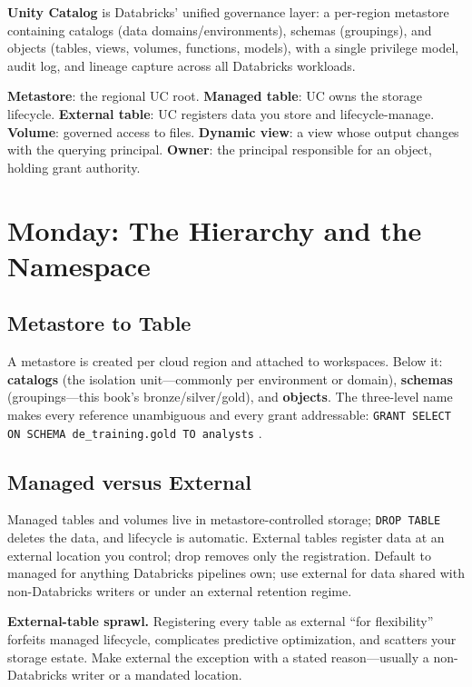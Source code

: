 \begin{definitionbox}
\textbf{Unity Catalog} is Databricks' unified governance layer: a per-region metastore containing catalogs (data domains/environments), schemas (groupings), and objects (tables, views, volumes, functions, models), with a single privilege model, audit log, and lineage capture across all Databricks workloads.
\end{definitionbox}

\begin{keyterms}
\textbf{Metastore}: the regional UC root. \textbf{Managed table}: UC owns the storage lifecycle. \textbf{External table}: UC registers data you store and lifecycle-manage. \textbf{Volume}: governed access to files. \textbf{Dynamic view}: a view whose output changes with the querying principal. \textbf{Owner}: the principal responsible for an object, holding grant authority.
\end{keyterms}

\section{Monday: The Hierarchy and the Namespace}
\subsection{Metastore to Table}
A metastore is created per cloud region and attached to workspaces. Below it: \textbf{catalogs} (the isolation unit---commonly per environment or domain), \textbf{schemas} (groupings---this book's bronze/silver/gold), and \textbf{objects}. The three-level name makes every reference unambiguous and every grant addressable: \texttt{GRANT SELECT ON SCHEMA de\_training.gold TO analysts} \cite{databricksUnityCatalog}.

\subsection{Managed versus External}
Managed tables and volumes live in metastore-controlled storage; \texttt{DROP TABLE} deletes the data, and lifecycle is automatic. External tables register data at an external location you control; drop removes only the registration. Default to managed for anything Databricks pipelines own; use external for data shared with non-Databricks writers or under an external retention regime.

\begin{pitfall}
\textbf{External-table sprawl.} Registering every table as external ``for flexibility'' forfeits managed lifecycle, complicates predictive optimization, and scatters your storage estate. Make external the exception with a stated reason---usually a non-Databricks writer or a mandated location.
\end{pitfall}

